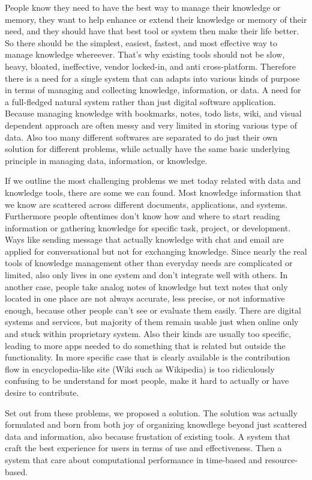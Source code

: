 People know they need to have the best way to manage their knowledge or memory, they want to help enhance or extend their knowledge or memory of their need, and they should have that best tool or system then make their life better.
So there should be the simplest, easiest, fastest, and most effective way to manage knowledge whereever.
That's why existing tools should not be slow, heavy, bloated, ineffective, vendor locked-in, and anti cross-platform.
Therefore there is a need for a single system that can adapts into various kinds of purpose in terms of managing and collecting knowledge, information, or data.
A need for a full-fledged natural system rather than just digital software application.
Because managing knowledge with bookmarks, notes, todo lists, wiki, and visual dependent approach are often messy and very limited in storing various type of data.
Also too many different softwares are separated to do just their own solution for different problems, while actually have the same basic underlying principle in managing data, information, or knowledge.

If we outline the most challenging problems we met today related with data and knowledge tools, there are some we can found.
Most knowledge information that we know are scattered across different documents, applications, and systems.
Furthermore people oftentimes don't know how and where to start reading information or gathering knowledge for specific task, project, or development.
Ways like sending message that actually knowledge with chat and email are applied for conversational but not for exchanging knowledge.
Since nearly the real tools of knowledge management other than everyday needs are complicated or limited, also only lives in one system and don't integrate well with others.
In another case, people take analog notes of knowledge but text notes that only located in one place are not always accurate, less precise, or not informative enough, because other people can't see or evaluate them easily.
There are digital systems and services, but majority of them remain usable just when online only and stuck within proprietary system.
Also their kinds are usually too specific, leading to more apps needed to do something that is related but outside the functionality.
In more specific case that is clearly available is the contribution flow in encyclopedia-like site (Wiki such as Wikipedia) is too ridiculously confusing to be understand for most people, make it hard to actually or have desire to contribute.

Set out from these problems, we proposed a solution.
The solution was actually formulated and born from both joy of organizing knowdlege beyond just scattered data and information, also because frustation of existing tools.
A system that craft the best experience for users in terms of use and effectiveness.
Then a system that care about computational performance in time-based and resource-based.

